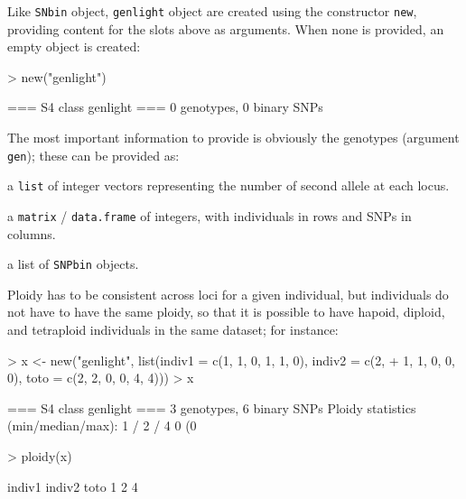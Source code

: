 \documentclass{article}
\begin{document}
\noindent Like \texttt{SNbin} object, \texttt{genlight} object are created using the constructor \texttt{new},
providing content for the slots above as arguments.
When none is provided, an empty object is created:
\begin{Schunk}
\begin{Sinput}
> new("genlight")
\end{Sinput}
\begin{Soutput}
 === S4 class genlight ===
 0 genotypes,  0 binary SNPs
\end{Soutput}
\end{Schunk}
The most important information to provide is obviously the genotypes (argument \texttt{gen}); these
can be provided as:
\begin{description}
\item a \texttt{list} of integer vectors representing the number of second allele at each locus.
\item a \texttt{matrix} / \texttt{data.frame} of integers, with individuals in rows and SNPs in columns.
\item a list of \texttt{SNPbin} objects.
\end{description}

Ploidy has to be consistent across loci for a given individual, but individuals do not have to have
the same ploidy, so that it is possible to have hapoid,
diploid, and tetraploid individuals in the same dataset; for instance:
\begin{Schunk}
\begin{Sinput}
> x <- new("genlight", list(indiv1 = c(1, 1, 0, 1, 1, 0), indiv2 = c(2, 
+     1, 1, 0, 0, 0), toto = c(2, 2, 0, 0, 4, 4)))
> x
\end{Sinput}
\begin{Soutput}
 === S4 class genlight ===
 3 genotypes,  6 binary SNPs
 Ploidy statistics (min/median/max): 1 / 2 / 4
 0 (0 %) missing data
\end{Soutput}
\begin{Sinput}
> ploidy(x)
\end{Sinput}
\begin{Soutput}
indiv1 indiv2   toto 
     1      2      4 
\end{Soutput}
\end{Schunk}
\end{document}
